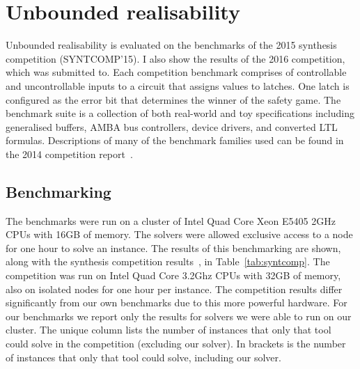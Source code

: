 
\clearpage

\section{Unbounded realisability}

Unbounded realisability is evaluated on the benchmarks of the 2015 synthesis competition (SYNTCOMP'15). I also show the results of the 2016 competition, which \termitesat was submitted to. Each competition benchmark comprises of controllable and uncontrollable inputs to a circuit that assigns values to latches. One latch is configured as the error bit that determines the winner of the safety game. The benchmark suite is a collection of both real-world and toy specifications including generalised buffers, AMBA bus controllers, device drivers, and converted LTL formulas.  Descriptions of many of the benchmark families used can be found in the 2014 competition report~\cite{Jacobs15}. 

\subsection{Benchmarking}

The benchmarks were run on a cluster of Intel Quad Core Xeon E5405 2GHz CPUs with 16GB of memory.  The solvers were allowed exclusive access to a node for one hour to solve an instance.  The results of this benchmarking are shown, along with the synthesis competition results~, in Table~\ref{tab:syntcomp}. The competition was run on Intel Quad Core 3.2Ghz CPUs with 32GB of memory, also on isolated nodes for one hour per instance. The competition results differ significantly from our own benchmarks due to this more powerful hardware.  For our benchmarks we report only the results for solvers we were able to run on our cluster. The unique column lists the number of instances that only that tool could solve in the competition (excluding our solver). In brackets is the number of instances that only that tool could solve, including our solver.

